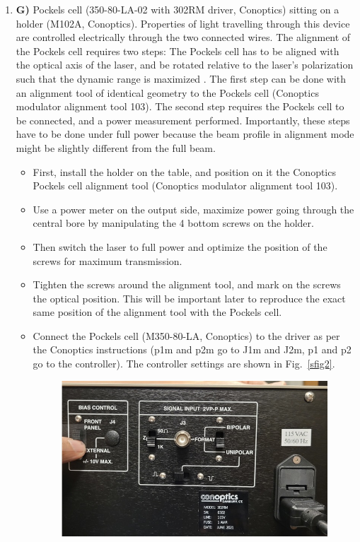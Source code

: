 \documentclass[10pt,letterpaper]{article}
\begin{document}
\begin{enumerate}[]
    \item \textbf{G)} Pockels cell (350-80-LA-02 with 302RM driver, Conoptics) sitting on a holder (M102A, Conoptics). Properties of light travelling through this device are controlled electrically through the two connected wires. The alignment of the Pockels cell requires two steps: The Pockels cell has to be aligned with the optical axis of the laser, and be rotated relative to the laser's polarization such that the dynamic range is maximized \cite{Conoptics2018, Scientifica2024}. The first step can be done with an alignment tool of identical geometry to the Pockels cell (Conoptics modulator alignment tool 103). The second step requires the Pockels cell to be connected, and a power measurement performed. Importantly, these steps have to be done under full power because the beam profile in alignment mode might be slightly different from the full beam.
    \begin{itemize}
        \item First, install the holder on the table, and position on it the Conoptics Pockels cell alignment tool (Conoptics modulator alignment tool 103).
        \item Use a power meter on the output side, maximize power going through the central bore by manipulating the 4 bottom screws on the holder.
        \item Then switch the laser to full power and optimize the position of the screws for maximum transmission.
        \item Tighten the screws around the alignment tool, and mark on the screws the optical position. This will be important later to reproduce the exact same position of the alignment tool with the Pockels cell.
        \item Connect the Pockels cell (M350-80-LA, Conoptics) to the driver as per the Conoptics instructions (p1m and p2m go to J1m and J2m, p1 and p2 go to the controller). The controller settings are shown in Fig.~\ref{sfig2}.
        \begin{figure}
            \includegraphics[width=.75\textwidth]{sfig2.jpg}

\end{figure}
\end{itemize}
\end{enumerate}
\end{document}

